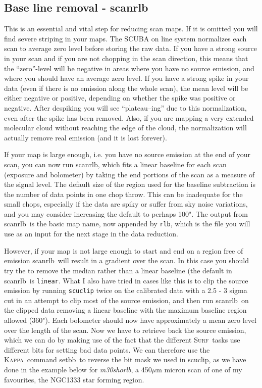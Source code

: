 \documentclass[twoside,11pt]{article}
\newcommand{\Kappa}{\xref{\textsc{Kappa}}{sun95}{}}
\newcommand{\surf}{\xref{\textsc{Surf}}{sun216}{}}
\newcommand{\task}[1]{\textsf{#1}}
\newcommand{\scanrlb}{\xref{\task{scan\_rlb}}{sun216}{SCAN_RLB}}
\newcommand{\scuclip}{\xref{\task{scuclip}}{sun216}{SCUCLIP}}
\newcommand{\setbb}{\xref{\task{setbb}}{sun95}{SETBB}}
\newcommand{\xref}[3]{#1}
\newcommand{\xlabel}[1]{}
\renewcommand{\_}{\texttt{\symbol{95}}}
\begin{document}
\subsection{\xlabel{Base_line_removal}Base line removal - \scanrlb}

This is an essential and vital step for reducing scan maps. If it is
omitted you will find severe striping in your maps. The SCUBA on line
system normalizes each scan to average zero level before storing the
raw data. If you have a strong source in your scan and if you are not
chopping in the scan direction, this means that the ``zero''-level will
be negative in areas where you have no source emission, and where you
should have an average zero level. If you have a strong spike in your
data (even if there is no emission along the whole scan), the mean
level will be either negative or positive, depending on whether the
spike was positive or negative. After despiking you will see
``plateau--ing'' due to this normalization, even after the spike has
been removed. Also, if you are mapping a very extended molecular cloud
without reaching the edge of the cloud, the normalization will actually
remove real emission (and it is lost forever).

If your map is large enough, i.e. you have no source emission at the
end of your scan, you can now run \scanrlb, which fits a linear
baseline for each scan (exposure and bolometer) by taking the end
portions of the scan as a measure of the signal level. The default size
of the region used for the baseline subtraction is the number of data
points in one chop throw. This can be inadequate for the small chops,
especially if the data are spiky or suffer from sky noise variations,
and you may consider increasing the default to perhaps 100". The output
from \scanrlb\ is the basic map name, now appended by \texttt{\_rlb},
which is the file you will use as an input for  the next stage in the
data reduction.

However, if your map is not large enough to start and end on a region
free of emission \scanrlb\ will result in a gradient over the scan. In
this case you should try the to remove the median rather than a linear
baseline (the default in \scanrlb\ is \texttt{linear}. What I also have
tried in cases like this is to clip the source emission by running
\texttt{scuclip} twice on the calibrated data with a 2.5 - 3 sigma cut
in an attempt to clip most of the source emission, and then run
\scanrlb\ on the clipped data removing a linear baseline with the
maximum baseline region allowed (360"). Each bolometer should now have
approximately a mean zero level over the length of the scan. Now we
have to retrieve back the source emission, which we can do by making
use of the fact that the different \surf\ tasks use different bits for
setting bad data points.  We can therefore use the \Kappa\ command
\setbb\ to reverse the bit mask we used in \scuclip, as we have done in
the example below for {\it m30\_sho\_rlb}, a 450$\mu$m micron scan
of one of my favourites, the NGC1333 star forming region.
\end{document}
